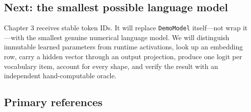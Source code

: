 \documentclass[
  10pt,
]{article}
\begin{document}
\subsection{Next: the smallest possible language
model}\label{next-the-smallest-possible-language-model}

Chapter 3 receives stable token IDs. It will replace \texttt{DemoModel}
itself---not wrap it---with the smallest genuine numerical language
model. We will distinguish immutable learned parameters from runtime
activations, look up an embedding row, carry a hidden vector through an
output projection, produce one logit per vocabulary item, account for
every shape, and verify the result with an independent hand-computable
oracle.

\subsection{Primary references}\label{primary-references-1}
\end{document}
